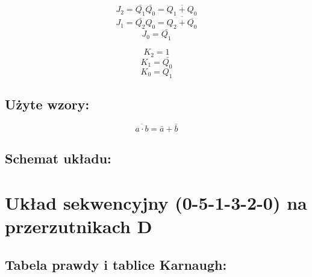 \documentclass[12pt,a4paper]{article}
\begin{document}
			\begin{minipage}{.5\textwidth}
				
				\begin{displaymath}
					J_2 = \bar{Q_1}\bar{Q_0} = \overline{Q_1 + Q_0}
				\end{displaymath}
				\begin{displaymath}
					J_1 = \bar{Q_2}Q_0 = \overline{Q_2 + \overline{Q_0}}
				\end{displaymath}
				\begin{displaymath}
					J_0 = \bar{Q_1}
				\end{displaymath}
				
			\end{minipage}%
			\begin{minipage}{.5\textwidth}
				
				\begin{displaymath}
					K_2 = 1
				\end{displaymath}
				\begin{displaymath}
					K_1 = \bar{Q_0}
				\end{displaymath}
				\begin{displaymath}
					K_0 = Q_1
				\end{displaymath}
				
			\end{minipage}
			
		\subsection{Użyte wzory:}
		
			\begin{equation}
			\overline{a\cdot b}=\bar{a}+\bar{b}
			\end{equation}
	
		\subsection{Schemat układu:}
		
	
	\section{Układ sekwencyjny (0-5-1-3-2-0) na przerzutnikach D}
		
		\subsection{Tabela prawdy i tablice Karnaugh:}
			
\end{document}
